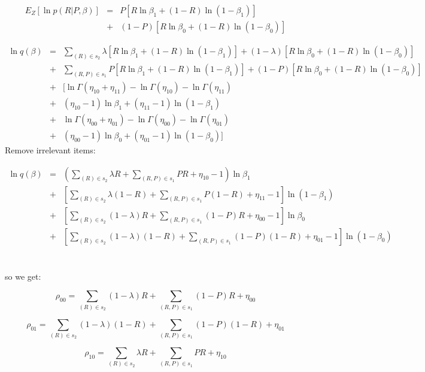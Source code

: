 \documentclass[11pt]{report}
\begin{document}
\begin{eqnarray*}
E_{Z}[\ln p(R|P,\beta)] &=&P[R\ln\beta_{1}+(1-R)\ln (1-\beta_{1})]\\
    &+& (1-P)[R\ln\beta_{0}+(1-R)\ln(1-\beta_{0})]
\end{eqnarray*}


\begin{eqnarray*}
    \ln q(\beta) &=& \sum_{(R)\in s_2}\lambda[R\ln\beta_{1}+(1-R)\ln (1-\beta_{1})] +(1-\lambda)[R\ln\beta_{0}+(1-R)\ln(1-\beta_{0})] \\
    &+& \sum_{(R,P)\in s_1}P[R\ln\beta_{1}+(1-R)\ln (1-\beta_{1})] +(1-P)[R\ln\beta_{0}+(1-R)\ln(1-\beta_{0})] \\
    &+& [\ln \Gamma(\eta_{10}+\eta_{11}) - \ln \Gamma(\eta_{10})-\ln\Gamma(\eta_{11}) \\
    &+& (\eta_{10}-1)\ln\beta_{1}+(\eta_{11}-1)\ln(1-\beta_1) \\
    &+&\ln \Gamma(\eta_{00}+\eta_{01}) - \ln \Gamma(\eta_{00})-\ln\Gamma(\eta_{01}) \\
    &+&(\eta_{00}-1)\ln\beta_{0}+(\eta_{01}-1)\ln(1-\beta_0)]
\end{eqnarray*}
Remove irrelevant items:

\begin{eqnarray*}
    \ln q(\beta) &=& (\sum_{(R)\in s_2}\lambda R + \sum_{(R,P)\in s_1}PR +\eta_{10}-1)\ln{\beta_{1}}\\
    &+&[\sum_{(R)\in s_2}\lambda (1-R) + \sum_{(R,P)\in s_1}P(1-R)+\eta_{11}-1]\ln(1-\beta_{1})\\
    &+&[\sum_{(R)\in s_2}(1-\lambda)R + \sum_{(R,P)\in s_1}(1-P)R +\eta_{00}-1]\ln{\beta_0}\\
    &+&[\sum_{(R)\in s_2}(1-\lambda)(1-R) + \sum_{(R,P)\in s_1}(1-P)(1-R) +\eta_{01}-1]\ln(1-\beta_{0})
\end{eqnarray*}
\\
\\
so we get:

\begin{equation}
    \rho_{00} = \sum_{(R)\in s_2}(1-\lambda)R + \sum_{(R,P)\in s_1}(1-P)R +\eta_{00}
\end{equation}

\begin{equation}
    \rho_{01} = \sum_{(R)\in s_2}(1-\lambda)(1-R) + \sum_{(R,P)\in s_1}(1-P)(1-R) +\eta_{01}
\end{equation}

\begin{equation}
    \rho_{10} = \sum_{(R)\in s_2}\lambda R + \sum_{(R,P)\in s_1}PR +\eta_{10}
\end{equation}
\end{document}
